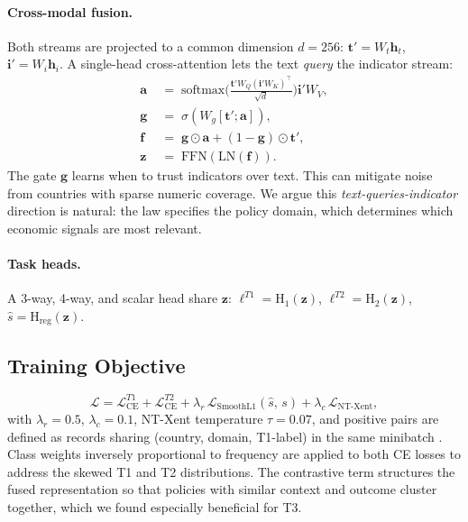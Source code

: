 \documentclass[11pt]{article}
\begin{document}
\paragraph{Cross-modal fusion.}
Both streams are projected to a common dimension $d=256$: $\mathbf{t}'\!=\!W_t\mathbf{h}_t$, $\mathbf{i}'\!=\!W_i\mathbf{h}_i$. A single-head cross-attention
lets the text \emph{query} the indicator stream:
\begin{align}
\mathbf{a}\;&=\;\text{softmax}\!\Big(\tfrac{\mathbf{t}'W_Q(\mathbf{i}'W_K)^{\!\top}}{\sqrt{d}}\Big)\mathbf{i}'W_V,\\
\mathbf{g}\;&=\;\sigma(W_g[\mathbf{t}';\mathbf{a}]),\\
\mathbf{f}\;&=\;\mathbf{g}\odot\mathbf{a}+(1-\mathbf{g})\odot\mathbf{t}',\\
\mathbf{z}\;&=\;\text{FFN}(\text{LN}(\mathbf{f})).
\end{align}
The gate $\mathbf{g}$ learns when to trust indicators over text. This can mitigate noise from countries with sparse numeric coverage. We argue this \emph{text-queries-indicator} direction is natural: the law specifies the policy domain, which determines which economic signals are most relevant.

\paragraph{Task heads.}
A 3-way, 4-way, and scalar head share $\mathbf{z}$:
$\ell^{T1}\!=\!\text{H}_{1}(\mathbf{z})$,
$\ell^{T2}\!=\!\text{H}_{2}(\mathbf{z})$,
$\hat{s}\!=\!\text{H}_{\text{reg}}(\mathbf{z})$.

\subsection{Training Objective}

\begin{equation}
\mathcal{L} = \mathcal{L}_{\text{CE}}^{T1} + \mathcal{L}_{\text{CE}}^{T2}
            + \lambda_r\,\mathcal{L}_{\text{SmoothL1}}(\hat{s},\,s)
            + \lambda_c\,\mathcal{L}_{\text{NT-Xent}},
\label{eq:loss}
\end{equation}
with $\lambda_r\!=\!0.5$, $\lambda_c\!=\!0.1$, NT-Xent temperature
$\tau\!=\!0.07$, and positive pairs are defined as records sharing (country, domain, T1-label) in the same minibatch \citep{chen2020simclr}. Class weights inversely proportional to frequency are applied to both CE losses to address the skewed T1 and T2 distributions. The contrastive term structures the fused
representation so that policies with similar context and outcome cluster together, which we found especially beneficial for T3.
\end{document}
